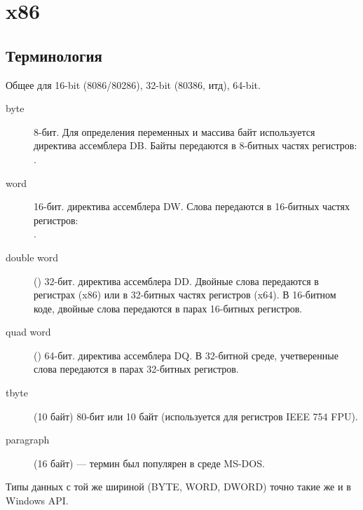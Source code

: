 \section{x86}

\subsection{Терминология}

Общее для 16-bit (8086/80286), 32-bit (80386, итд), 64-bit.

\begin{description}
	\item[byte] 8-бит. 
		Для определения переменных и массива байт используется директива ассемблера DB.
		Байты передаются в 8-битных частях регистров: .
	\item[word] 16-бит. \dittoclosing директива ассемблера DW.
		Слова передаются в 16-битных частях регистров: \\
			.
	\item[double word] () 32-бит. \dittoclosing директива ассемблера DD.
		Двойные слова передаются в регистрах (x86) или в 32-битных частях регистров (x64). 
		В 16-битном коде, двойные слова передаются в парах 16-битных регистров.
	\item[quad word] () 64-бит. \dittoclosing директива ассемблера DQ.
		В 32-битной среде, учетверенные слова передаются в парах 32-битных регистров.
	\item[tbyte] (10 байт) 80-бит или 10 байт (используется для регистров IEEE 754 FPU).
	\item[paragraph] (16 байт) --- термин был популярен в среде MS-DOS.
\end{description}

Типы данных с той же шириной (BYTE, WORD, DWORD) точно такие же и в Windows \ac{API}.


